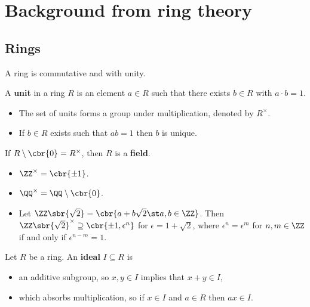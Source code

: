 \pagebreak

\section{Background from ring theory}

\subsection{Rings}


A ring is commutative and with unity.

\begin{definition}
A \textbf{unit} in a ring $ R $ is an element $ a \in R $ such that there exists $ b \in R $ with $ a \cdot b = 1 $.
\begin{itemize}
\item The set of units forms a group under multiplication, denoted by $ R^\times $.
\item If $ b \in R $ exists such that $ ab = 1 $ then $ b $ is unique.
\end{itemize}
If $ R \setminus \cbr{0} = R^\times $, then $ R $ is a \textbf{field}.
\end{definition}

\begin{example*}
\hfill
\begin{itemize}
\item $ \ZZ^\times = \cbr{\pm 1} $.
\item $ \QQ^\times = \QQ \setminus \cbr{0} $.
\item Let $ \ZZ\sbr{\sqrt{2}} = \cbr{a + b\sqrt{2} \st a, b \in \ZZ} $. Then $ \ZZ\sbr{\sqrt{2}}^\times \supseteq \cbr{\pm 1, \epsilon^n} $ for $ \epsilon = 1 + \sqrt{2} $, where $ \epsilon^n = \epsilon^m $ for $ n, m \in \ZZ $ if and only if $ \epsilon^{n - m} = 1 $.
\end{itemize}
\end{example*}

\begin{definition}
Let $ R $ be a ring. An \textbf{ideal} $ I \subseteq R $ is
\begin{itemize}
\item an additive subgroup, so $ x, y \in I $ implies that $ x + y \in I $,
\item which absorbs multiplication, so if $ x \in I $ and $ a \in R $ then $ ax \in I $.
\end{itemize}
\end{definition}


